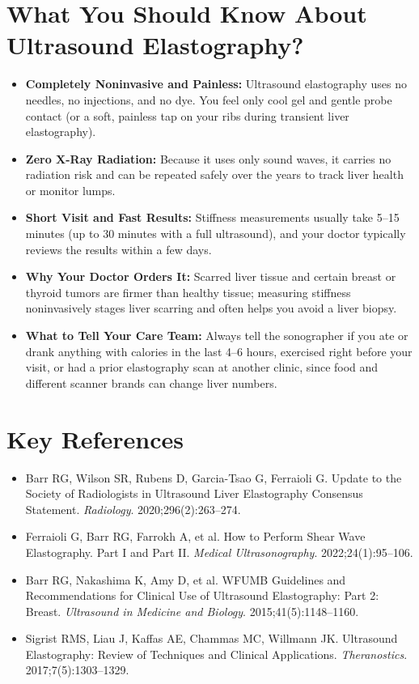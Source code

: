 \section{What You Should Know About Ultrasound Elastography?}

\begin{itemize}
    \item \textbf{Completely Noninvasive and Painless:} Ultrasound elastography uses no needles, no injections, and no dye. You feel only cool gel and gentle probe contact (or a soft, painless tap on your ribs during transient liver elastography).
    \item \textbf{Zero X-Ray Radiation:} Because it uses only sound waves, it carries no radiation risk and can be repeated safely over the years to track liver health or monitor lumps.
    \item \textbf{Short Visit and Fast Results:} Stiffness measurements usually take 5--15 minutes (up to 30 minutes with a full ultrasound), and your doctor typically reviews the results within a few days.
    \item \textbf{Why Your Doctor Orders It:} Scarred liver tissue and certain breast or thyroid tumors are firmer than healthy tissue; measuring stiffness noninvasively stages liver scarring and often helps you avoid a liver biopsy.
    \item \textbf{What to Tell Your Care Team:} Always tell the sonographer if you ate or drank anything with calories in the last 4--6 hours, exercised right before your visit, or had a prior elastography scan at another clinic, since food and different scanner brands can change liver numbers.
\end{itemize}

\section{Key References}

\begin{itemize}
    \item Barr RG, Wilson SR, Rubens D, Garcia-Tsao G, Ferraioli G. Update to the Society of Radiologists in Ultrasound Liver Elastography Consensus Statement. \textit{Radiology}. 2020;296(2):263--274.
    \item Ferraioli G, Barr RG, Farrokh A, et al. How to Perform Shear Wave Elastography. Part I and Part II. \textit{Medical Ultrasonography}. 2022;24(1):95--106.
    \item Barr RG, Nakashima K, Amy D, et al. WFUMB Guidelines and Recommendations for Clinical Use of Ultrasound Elastography: Part 2: Breast. \textit{Ultrasound in Medicine and Biology}. 2015;41(5):1148--1160.
    \item Sigrist RMS, Liau J, Kaffas AE, Chammas MC, Willmann JK. Ultrasound Elastography: Review of Techniques and Clinical Applications. \textit{Theranostics}. 2017;7(5):1303--1329.
\end{itemize}
